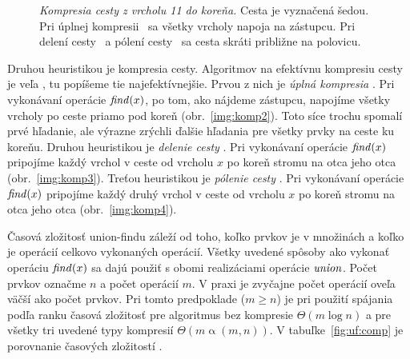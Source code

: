 \begin{figure}
\label{img:kompresia}
\caption{\emph{Kompresia cesty z vrcholu 11 do koreňa.} 
Cesta je vyznačená šedou. 
Pri úplnej kompresii~ sa všetky vrcholy 
napoja na zástupcu. Pri delení cesty~ a pólení 
cesty~ sa cesta skráti približne na polovicu.}
\end{figure}
 
Druhou heuristikou je kompresia cesty. Algoritmov na efektívnu kompresiu 
cesty je veľa \citep{paths2}, tu popíšeme tie najefektívnejšie. Prvou z nich 
je \emph{úplná kompresia} \citep{comp1}. Pri vykonávaní operácie $\mathop{\mathit{find}}(x)$, po 
tom, ako nájdeme zástupcu, napojíme všetky vrcholy po ceste priamo pod koreň 
(obr.~\ref{img:komp2}). Toto síce trochu spomalí prvé hľadanie, ale výrazne 
zrýchli ďalšie hľadania pre všetky prvky na ceste ku koreňu. Druhou 
heuristikou je \emph{delenie cesty} \citep{comp2}. Pri vykonávaní operácie 
$\mathop{\mathit{find}}(x)$ pripojíme každý vrchol v ceste od vrcholu $x$ po koreň stromu na otca 
jeho otca (obr.~\ref{img:komp3}). Treťou heuristikou je \emph{pólenie cesty} 
\citep{comp2}. Pri vykonávaní operácie $\mathop{\mathit{find}}(x)$  pripojíme každý druhý vrchol 
v ceste od vrcholu $x$ po koreň stromu na otca jeho otca 
(obr.~\ref{img:komp4}).

Časová zložitosť union-findu záleží od toho, koľko prvkov je v množinách a koľko je 
operácií celkovo vykonaných operácií. Všetky uvedené spôsoby ako vykonať 
operáciu $\mathop{\mathit{find}}(x)$ sa dajú použiť s obomi realizáciami operácie $\mathop{\mathit{union}}$. 
Počet prvkov označme $n$ a počet operácií $m$. V praxi je zvyčajne počet 
operácií oveľa väčší ako počet prvkov. Pri tomto predpoklade ($m\geq n$) je 
pri použití spájania podľa ranku časová zložitosť pre algoritmus bez kompresie 
$\Theta(m\log n)$ a pre všetky tri uvedené typy kompresií 
$\Theta(m\mathop{\alpha}(m,n))$. 
V tabuľke~\ref{fig:uf:comp} je porovnanie časových zložitostí \citep{paths2}.

